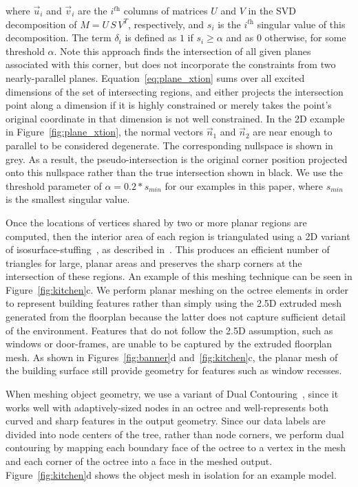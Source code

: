 \documentclass[review]{acmsiggraph}
\begin{document}
where $\vec{u}_i$ and $\vec{v}_i$ are the $i^{\textit{th}}$ columns of matrices $U$ and $V$ in the SVD decomposition of $M = U \, S \, V^T$, respectively, and $s_i$ is the $i^{\textit{th}}$ singular value of this decomposition.  The term $\delta_i$ is defined as $1$ if $s_i \geq \alpha$ and as $0$ otherwise, for some threshold $\alpha$.  Note this approach finds the intersection of all given planes associated with this corner, but does not incorporate the constraints from two nearly-parallel planes.  Equation~\ref{eq:plane_xtion} sums over all excited dimensions of the set of intersecting regions, and either projects the intersection point along a dimension if it is highly constrained or merely takes the point's original coordinate in that dimension is not well constrained.  In the 2D example in Figure~\ref{fig:plane_xtion}, the normal vectors $\vec{n}_1$ and $\vec{n}_2$ are near enough to parallel to be considered degenerate.  The corresponding nullspace is shown in grey.  As a result, the pseudo-intersection is the original corner position projected onto this nullspace rather than the true intersection shown in black. We use the threshold parameter of $\alpha=0.2 * s_{min}$ for our examples in this paper, where $s_{min}$ is the smallest singular value.

Once the locations of vertices shared by two or more planar regions are computed, then the interior area of each region is triangulated using a 2D variant of isosurface-stuffing~\cite{Isostuffing}, as described in~\cite{Turner13}.  This produces an efficient number of triangles for large, planar areas and preserves the sharp corners at the intersection of these regions.  An example of this meshing technique can be seen in Figure~\ref{fig:kitchen}c.  We perform planar meshing on the octree elements in order to represent building features rather than simply using the 2.5D extruded mesh generated from the floorplan because the latter does not capture sufficient detail of the environment.  Features that do not follow the 2.5D assumption, such as windows or door-frames, are unable to be captured by the extruded floorplan mesh.  As shown in Figures~\ref{fig:banner}d and~\ref{fig:kitchen}c, the planar mesh of the building surface still provide geometry for features such as window recesses.

When meshing object geometry, we use a variant of Dual Contouring~\cite{DualContouring}, since it works well with adaptively-sized nodes in an octree and well-represents both curved and sharp features in the output geometry.  Since our data labels are divided into node centers of the tree, rather than node corners, we perform dual contouring by mapping each boundary face of the octree to a vertex in the mesh and each corner of the octree into a face in the meshed output.  Figure~\ref{fig:kitchen}d shows the object mesh in isolation for an example model.
\end{document}
